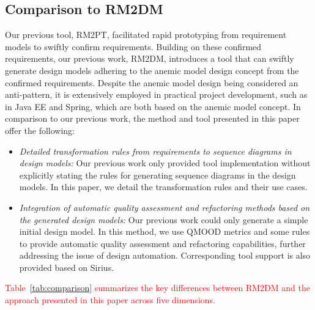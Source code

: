 \documentclass[pdflatex,sn-mathphys-num]{sn-jnl}%
\theoremstyle{thmstyleone}%
\theoremstyle{thmstyletwo}%
\theoremstyle{thmstylethree}%
\begin{document}
\subsection{Comparison to RM2DM}
Our previous tool, RM2PT, facilitated rapid prototyping from requirement models to swiftly confirm requirements. Building on these confirmed requirements, our previous work, RM2DM\cite{RM2DM}, introduces a tool that can swiftly generate design models adhering to the anemic model design concept from the confirmed requirements. Despite the anemic model design being considered an anti-pattern, it is extensively employed in practical project development, such as in Java EE and Spring, which are both based on the anemic model concept. In comparison to our previous work, the method and tool presented in this paper offer the following:
\begin{itemize}
    \item \textit{Detailed transformation rules from requirements to sequence diagrams in design models:} Our previous work only provided tool implementation without explicitly stating the rules for generating sequence diagrams in the design models. In this paper, we detail the transformation rules and their use cases.
    \item \textit{Integration of automatic quality assessment and refactoring methods based on the generated design models:} Our previous work could only generate a simple initial design model. In this method, we use QMOOD metrics and some rules to provide automatic quality assessment and refactoring capabilities, further addressing the issue of design automation. Corresponding tool support is also provided based on Sirius.
\end{itemize}

\noindent\textcolor{red}{Table~\ref{tab:comparison} summarizes the key differences between RM2DM and the approach presented in this paper across five dimensions.}
\end{document}
